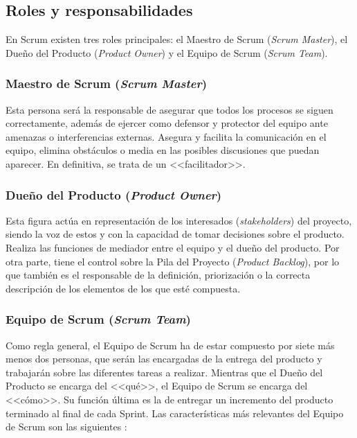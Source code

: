 \clearpage

\subsection{Roles y responsabilidades}
En Scrum existen tres roles principales: el Maestro de Scrum (\textit{Scrum Master}), el Dueño del Producto (\textit{Product Owner}) y el Equipo de Scrum (\textit{Scrum Team}).

\subsubsection{Maestro de Scrum (\textit{Scrum Master})}
Esta persona será la responsable de asegurar que todos los procesos se siguen correctamente, además de ejercer como defensor y protector del equipo ante amenazas o interferencias externas. Asegura y facilita la comunicación en el equipo, elimina obstáculos o media en las posibles discusiones que puedan aparecer. En definitiva, se trata de un <<facilitador>>.

\subsubsection{Dueño del Producto (\textit{Product Owner})}
Esta figura actúa en representación de los interesados (\textit{stakeholders}) del proyecto, siendo la voz de estos y con la capacidad de tomar decisiones sobre el producto. Realiza las funciones de mediador entre el equipo y el dueño del producto. Por otra parte, tiene el control sobre la Pila del Proyecto (\textit{Product Backlog}), por lo que también es el responsable de la definición, priorización o la correcta descripción de los elementos de los que esté compuesta.

\subsubsection{Equipo de Scrum (\textit{Scrum Team})}
Como regla general, el Equipo de Scrum ha de estar compuesto por siete más menos dos personas, que serán las encargadas de la entrega del producto y trabajarán sobre las diferentes tareas a realizar. Mientras que el Dueño del Producto se encarga del <<qué>>, el Equipo de Scrum se encarga del <<cómo>>. Su función última es la de entregar un incremento del producto terminado al final de cada Sprint. Las características más relevantes del Equipo de Scrum son las siguientes \cite{scrumguide}:

